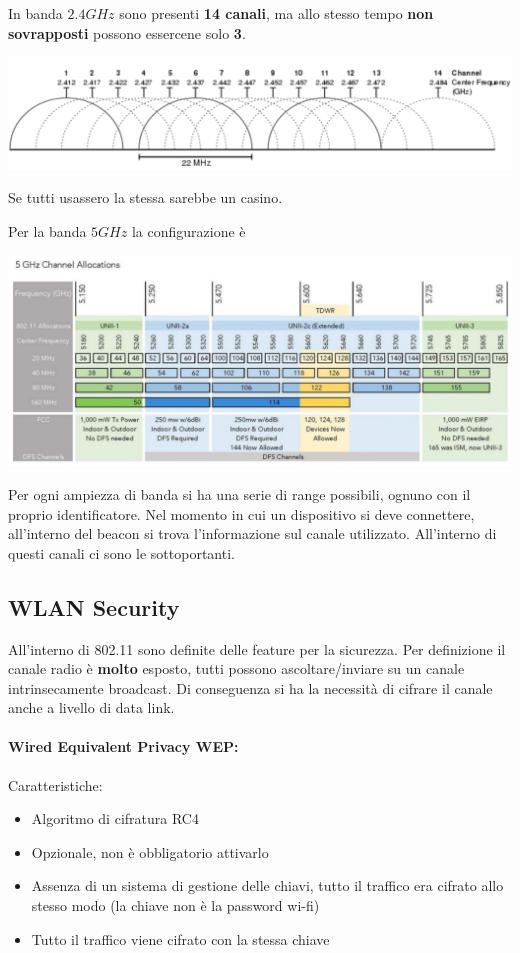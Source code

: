 
In banda $2.4GHz$ sono presenti \textbf{14 canali}, ma allo stesso tempo \textbf{non sovrapposti} possono essercene solo \textbf{3}.
\begin{center}
	\includegraphics[width=0.95\linewidth]{img/wlan/24bande}
\end{center}
Se tutti usassero la stessa sarebbe un casino.

Per la banda $5GHz$ la configurazione è 
\begin{center}
	\includegraphics[width=0.95\linewidth]{img/wlan/5bande}
\end{center}
Per ogni ampiezza di banda si ha una serie di range possibili, ognuno con il proprio identificatore. Nel momento in cui un dispositivo si deve connettere, all'interno del beacon si trova l'informazione sul canale utilizzato. All'interno di questi canali ci sono le sottoportanti.

\subsection{WLAN Security}
All'interno di 802.11 sono definite delle feature per la sicurezza. Per definizione il canale radio è \textbf{molto} esposto, tutti possono ascoltare/inviare su un canale intrinsecamente broadcast. Di conseguenza si ha la necessità di cifrare il canale anche a livello di data link.

\paragraph{Wired Equivalent Privacy WEP:} Caratteristiche:
\begin{itemize}
	\item Algoritmo di cifratura RC4
	\item Opzionale, non è obbligatorio attivarlo
	\item Assenza di un sistema di gestione delle chiavi, tutto il traffico era cifrato allo stesso modo (la chiave non è la password wi-fi)
	\item Tutto il traffico viene cifrato con la stessa chiave
\end{itemize}

